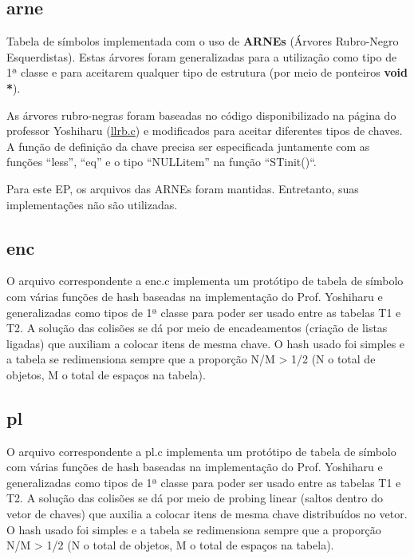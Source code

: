 \documentclass[a4paper,12pt]{article}
\begin{document}
    \subsection{arne} 
        Tabela de símbolos implementada com o uso de \textbf{ARNEs}
        (Árvores Rubro-Negro Esquerdistas). Estas árvores foram
        generalizadas para a utilização como tipo de 1ª classe e para
        aceitarem qualquer tipo de estrutura (por meio de ponteiros 
        \textbf{void *}).

        As árvores rubro-negras foram baseadas no código disponibilizado
        na página do professor Yoshiharu
        (\href{http://www.ime.usp.br/~yoshi/2012i/mac323/exx/LLRB.3/llrb.c}{llrb.c})
        e modificados para aceitar diferentes tipos de chaves. A função de 
        definição da chave precisa ser especificada juntamente com as
        funções ``less'', ``eq'' e o tipo ``NULLitem'' na função 
        ``STinit()``.
        
        Para este EP, os arquivos das ARNEs foram mantidas. Entretanto,
        suas implementações não são utilizadas.

    \subsection{enc} 
        O arquivo correspondente a enc.c implementa um protótipo de
        tabela de símbolo com várias funções de hash baseadas na
        implementação do Prof. Yoshiharu e generalizadas como tipos de
        1ª classe para poder ser usado entre as tabelas T1 e T2. A
        solução das colisões se dá por meio de encadeamentos (criação de
        listas ligadas) que auxiliam a colocar itens de mesma chave. O
        hash usado foi simples e a tabela se redimensiona sempre que a
        proporção N/M > 1/2 (N o total de objetos, M o total de espaços
        na tabela).
    \subsection{pl} 
        O arquivo correspondente a pl.c implementa um protótipo de
        tabela de símbolo com várias funções de hash baseadas na
        implementação do Prof. Yoshiharu e generalizadas como tipos de
        1ª classe para poder ser usado entre as tabelas T1 e T2. A
        solução das colisões se dá por meio de probing linear
        (saltos dentro do vetor de chaves) que auxilia a colocar itens
        de mesma chave distribuídos no vetor. O
        hash usado foi simples e a tabela se redimensiona sempre que a
        proporção N/M > 1/2 (N o total de objetos, M o total de espaços
        na tabela).
\end{document}
